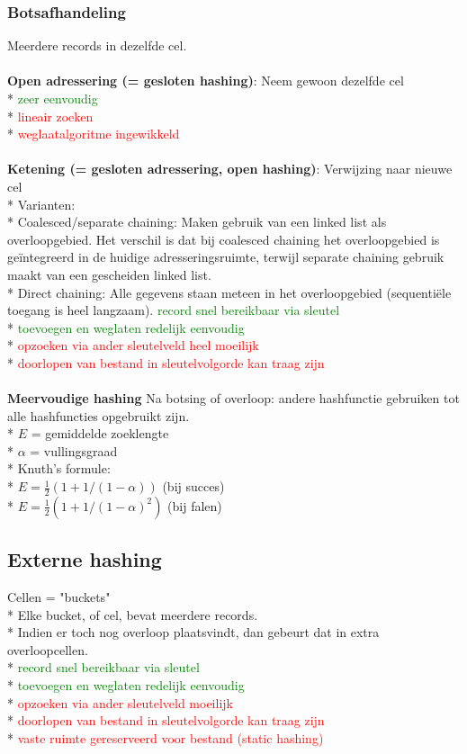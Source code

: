\documentclass[10pt]{article}
\begin{document}
\subsubsection{Botsafhandeling}
Meerdere records in dezelfde cel.\\\\
\textbf{Open adressering (= gesloten hashing)}: Neem gewoon dezelfde cel\\*
\textcolor{green}{zeer eenvoudig}\\*
\textcolor{red}{lineair zoeken}\\*
\textcolor{red}{weglaatalgoritme ingewikkeld}\\\\
\textbf{Ketening (= gesloten adressering, open hashing)}: Verwijzing naar nieuwe cel\\*
Varianten:\\*
Coalesced/separate chaining: Maken gebruik van een linked list als overloopgebied. Het verschil is dat bij coalesced chaining het overloopgebied is ge\"integreerd in de huidige adresseringsruimte, terwijl separate chaining gebruik maakt van een gescheiden linked list.\\*
Direct chaining: Alle gegevens staan meteen in het overloopgebied (sequenti\"ele toegang is heel langzaam).
\textcolor{green}{record snel bereikbaar via sleutel}\\*
\textcolor{green}{toevoegen en weglaten redelijk eenvoudig}\\*
\textcolor{red}{opzoeken via ander sleutelveld heel moeilijk}\\*
\textcolor{red}{doorlopen van bestand in sleutelvolgorde kan traag zijn}\\\\
\textbf{Meervoudige hashing}
Na botsing of overloop: andere hashfunctie gebruiken tot alle hashfuncties opgebruikt zijn.\\*
$E$ = gemiddelde zoeklengte\\*
$\alpha$ = vullingsgraad\\*
Knuth's formule:\\*
$E = \frac{1}{2}(1+1/(1-\alpha))$ (bij succes)\\*
$E = \frac{1}{2}(1+1/(1-\alpha)^2)$ (bij falen)
\subsection{Externe hashing}
Cellen = "buckets"\\*
Elke bucket, of cel, bevat meerdere records.\\*
Indien er toch nog overloop plaatsvindt, dan gebeurt dat in extra overloopcellen.\\*
\textcolor{green}{record snel bereikbaar via sleutel}\\*
\textcolor{green}{toevoegen en weglaten redelijk eenvoudig}\\*
\textcolor{red}{opzoeken via ander sleutelveld moeilijk}\\*
\textcolor{red}{doorlopen van bestand in sleutelvolgorde kan traag zijn}\\*
\textcolor{red}{vaste ruimte gereserveerd voor bestand (static hashing)}
\end{document}
